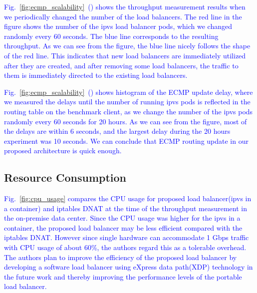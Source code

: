 \textcolor{blue}{
Fig.~\ref{fig:ecmp_scalability}~() shows the throughput measurement results when we periodically changed the number of the load balancers. 
The red line in the figure shows the number of the ipvs load balancer pods, which we changed randomly every 60 seconds.
The blue line corresponds to the resulting throughput.
As we can see from the figure, the blue line nicely follows the shape of the red line.
This indicates that new load balancers are immediately utilized after they are created, and after removing some load balancers, the traffic to them is immediately directed to the existing load balancers.
}

\textcolor{blue}{
Fig.~\ref{fig:ecmp_scalability}~() shows histogram of the ECMP update delay, where we measured the delays until the number of running ipvs pods is reflected in the routing table on the benchmark client, as we change the number of the ipvs pods randomly every 60 seconds for 20 hours.
As we can see from the figure, most of the delays are within 6 seconds, and the largest delay during the 20 hours experiment was 10 seconds.
We can conclude that ECMP routing update in our proposed architecture is quick enough.
}

\FloatBarrier

\subsection{Resource Consumption}

\textcolor{blue}{
Fig.~\ref{fig:cpu_usage} compares the CPU usage for proposed load balancer(ipvs in a container) and iptables DNAT at the time of the throughput measurement in the on-premise data center.
Since the CPU usage was higher for the ipvs in a container, the proposed load balancer may be less efficient compared with the iptables DNAT.
However since single hardware can accommodate 1 Gbps traffic with CPU usage of about 60\%, the authors regard this as a tolerable overhead.
The authors plan to improve the efficiency of the proposed load balancer by developing a software load balancer using eXpress data path(XDP) technology\cite{hoiland2018express} in the future work and thereby improving the performance levels of the portable load balancer.
}

